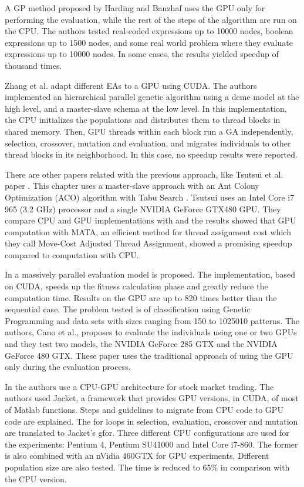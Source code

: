\documentclass[prodmode,acmtecs]{acmsmall}
\begin{document}
A GP method proposed by Harding and Banzhaf \cite{4215552} uses the GPU only for performing the evaluation, while the rest of the steps of the algorithm are run on the CPU. The authors tested real-coded expressions up to 10000 nodes, boolean expressions up to 1500 nodes, and some real world problem where they evaluate expressions up to 10000 nodes. In some cases, the results yielded speedup of thousand times.

Zhang et al. \cite{Zhang2009} adapt different EAs to a GPU using CUDA. The authors implemented an hierarchical parallel genetic algorithm using a deme model at the high level, and a master-slave schema at the low level. In this implementation, the CPU initializes the populations and distributes them to thread blocks in shared memory. Then, GPU threads within each block run a GA independently, selection, crossover, mutation and evaluation, and migrates individuals to other thread blocks in its neighborhood. In this case, no speedup results were reported.

There are other papers related with the previous approach, like Tsutsui et al. paper \cite{Tsutsui:2011:GECCO}. This chapter uses a master-slave approach with an Ant Colony Optimization (ACO) algorithm \cite{Dorigo:1999:ACO:329055_329062} with Tabu Search \cite{Glover:1997:TS:549765}. Tsutsui uses an Intel Core i7 965 (3.2 GHz) processor and a single NVIDIA GeForce GTX480 GPU. They compare CPU and GPU implementations with and the results showed that GPU computation with MATA, an efficient method for thread assignment cost which they call Move-Cost Adjusted Thread Assignment, showed a promising speedup compared to computation with CPU.

In \cite{Cano:2012:SUE:2150467.2150468} a massively parallel evaluation model is proposed. The implementation, based on CUDA, speeds up the fitness calculation phase and greatly reduce the computation time. Results on the GPU are up to 820 times better than the sequential case. The problem tested is of classification using Genetic Programming and data sets with sizes ranging from 150 to 1025010 patterns. The authors, Cano et al., proposes to evaluate the individuals using one or two GPUs and they test two models, the NVIDIA GeForce 285 GTX and the NVIDIA GeForce 480 GTX. These paper uses the traditional approach of using the GPU only during the evaluation process.

In \cite{Contreras:2012:UGA:2150467.2150469} the authors use a CPU-GPU architecture for stock market trading. The authors used Jacket, a framework that provides GPU versions, in CUDA, of most of Matlab functions. Steps and guidelines to migrate from CPU code to GPU code are explained. The for loops in selection, evaluation, crossover and mutation are translated to Jacket's gfor. Three different CPU configurations are used for the experiments: Pentium 4, Pentium SU41000 and Intel Core i7-860. The former is also combined with an nVidia 460GTX for GPU experiments. Different population size are also tested. The time is reduced to 65\% in comparison with the CPU version.
\end{document}
